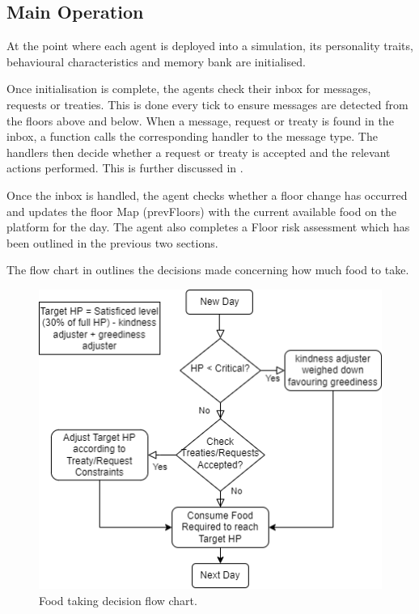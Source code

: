 \subsection{Main Operation}
\label{subsec: Main Operation}
At the point where each agent is deployed into a simulation, its personality traits, behavioural characteristics and memory bank are initialised. 

Once initialisation is complete, the agents check their inbox for messages, requests or treaties. This is done every tick to ensure messages are detected from the floors above and below. When a message, request or treaty is found in the inbox, a function calls the corresponding handler to the message type. The handlers then decide whether a request or treaty is accepted and the relevant actions performed. This is further discussed in . 

Once the inbox is handled, the agent checks whether a floor change has occurred and updates the floor Map (prevFloors) with the current available food on the platform for the day. The agent also completes a Floor risk assessment which has been outlined in the previous two sections. 

The flow chart in  outlines the decisions made concerning how much food to take.

\begin{figure}[h!]
    \begin{center}
        \includegraphics[scale=0.75]{009_team_7_agent_design/Images/v2.drawio.png}
    \end{center}
    \caption{Food taking decision flow chart.}
    \label{fig: operation flow chart}
\end{figure}

